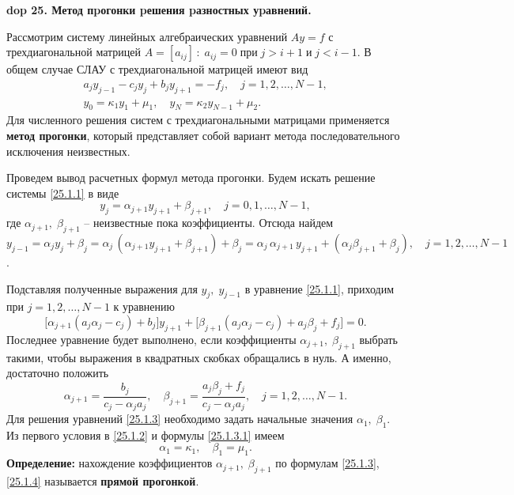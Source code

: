 \textbf{\LARGE dop 25. Метод пpогонки pешения pазностных уpавнений.}
\renewcommand{\theequation}{\arabic{equation}}

Рассмотрим систему линейных алгебраических уравнений $A y = f$ с трехдиагональной матрицей $A = [a_{ij}]\,:\; a_{ij} = 0 \;\textit{при}\; j > i+1\;\textit{и}\;j < i-1$. В общем случае СЛАУ с трехдиагональной матрицей имеют вид 
\begin{align}
\label{25.1.1}
    a_j y_{j-1} - c_j y_j + b_j y_{j+1} = -f_j, \quad j = 1, 2, \ldots, N - 1,\\
    \label{25.1.2}
    y_0 = \kappa_1 y_1 + \mu_1, \quad y_N = \kappa_2 y_{N-1} + \mu_2.
\end{align}
Для численного решения систем с трехдиагональными матрицами применяется \textbf{метод прогонки}, который представляет собой вариант метода последовательного исключения неизвестных. 

Проведем вывод расчетных формул метода прогонки. Будем искать решение системы \eqref{25.1.1} в виде 
\begin{equation}\label{25.1.3.1}
    y_j = \alpha_{j+1} y_{j+1} + \beta_{j+1}, \quad j = 0, 1, \ldots, N-1,
\end{equation}
где $\alpha_{j+1}, \; \beta_{j+1}$ -- неизвестные пока коэффициенты. Отсюда найдем $y_{j-1} = \alpha_{j} y_{j} + \beta_{j} = \alpha_j \,(\alpha_{j+1} y_{j+1} + \beta_{j+1}) + \beta_j = \alpha_j \,\alpha_{j+1}\,y_{j+1} + (\alpha_j \beta_{j+1} + \beta_j), \quad j = 1,2, \ldots, N-1$.

Подставляя полученные выражения для $y_j, \; y_{j-1}$ в уравнение \eqref{25.1.1}, приходим при $ j = 1,2, \ldots, N-1$ к уравнению
$$
\big[\alpha_{j+1}(a_j \alpha_j - c_j) + b_j \big] y_{j+1} + \big[\beta_{j+1}(a_j \alpha_j - c_j) + a_j \beta_j + f_j \big] = 0.
$$
Последнее уравнение будет выполнено, если коэффициенты $\alpha_{j+1}, \;\beta_{j+1}$ выбрать такими, чтобы выражения в квадратных скобках обращались в нуль. А именно, достаточно положить
\begin{equation}
    \label{25.1.3}
    \alpha_{j+1} = \frac{b_j}{c_j - \alpha_j a_j}, \quad 
    \beta_{j+1} = \frac{a_j \beta_j + f_j}{c_j - \alpha_j a_j}, \quad
    j = 1, 2, \ldots, N-1.
\end{equation}
Для решения уравнений \eqref{25.1.3} необходимо задать начальные значения $\alpha_1, \; \beta_1$. Из первого условия в \eqref{25.1.2} и формулы \eqref{25.1.3.1} имеем 
\begin{equation}
    \label{25.1.4}
    \alpha_1 = \kappa_1,\quad \beta_1 = \mu_1.
\end{equation}
\textbf{Определение:\;} нахождение коэффициентов $\alpha_{j+1}, \; \beta_{j+1}$ по формулам \eqref{25.1.3}, \eqref{25.1.4} называется \textbf{прямой прогонкой}.

